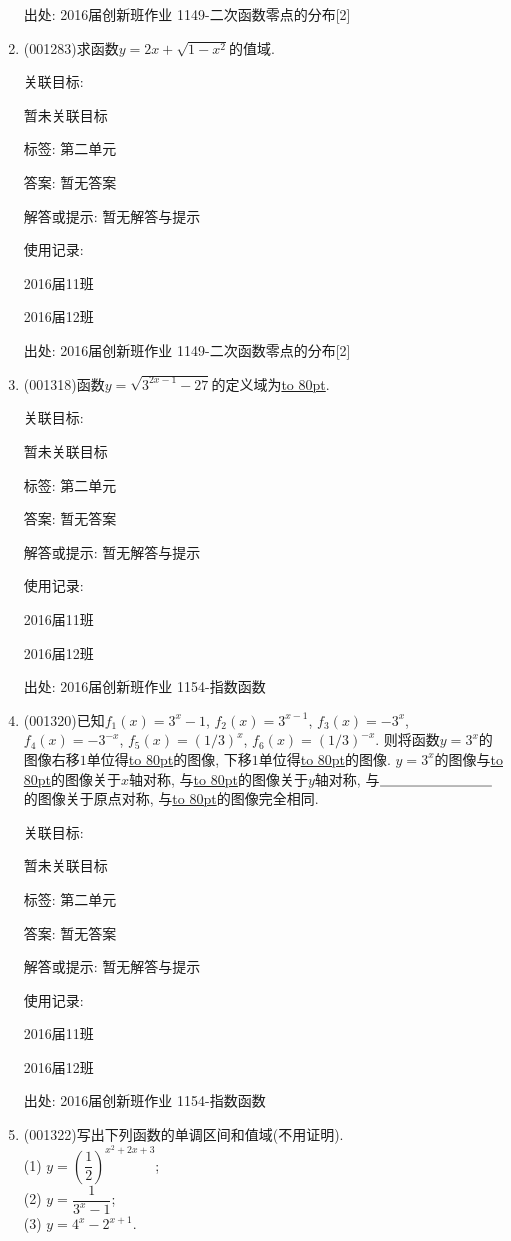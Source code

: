 \documentclass[10pt,a4paper]{article}
\newcommand{\blank}[1]{\underline{\hbox to #1pt{}}}
\begin{document}
\begin{enumerate}[1.]
出处: 2016届创新班作业	1149-二次函数零点的分布[2]
\item { (001283)}求函数$y=2x+\sqrt{1-x^2}$的值域.


关联目标:

暂未关联目标



标签: 第二单元

答案: 暂无答案

解答或提示: 暂无解答与提示

使用记录:

2016届11班	

2016届12班	


出处: 2016届创新班作业	1149-二次函数零点的分布[2]
\item { (001318)}函数$y=\sqrt{3^{2x-1}-27}$的定义域为\blank{80}.


关联目标:

暂未关联目标



标签: 第二单元

答案: 暂无答案

解答或提示: 暂无解答与提示

使用记录:

2016届11班	

2016届12班	


出处: 2016届创新班作业	1154-指数函数
\item { (001320)}已知$f_1(x)=3^x-1$, $f_2(x)=3^{x-1}$, $f_3(x)=-3^x$, $f_4(x)=-3^{-x}$, $f_5(x)=(1/3)^x$, $f_6(x)=(1/3)^{-x}$. 则将函数$y=3^x$的图像右移$1$单位得\blank{80}的图像, 下移$1$单位得\blank{80}的图像. $y=3^x$的图像与\blank{80}的图像关于$x$轴对称, 与\blank{80}的图像关于$y$轴对称, 与$\blank{80}$的图像关于原点对称, 与\blank{80}的图像完全相同.


关联目标:

暂未关联目标



标签: 第二单元

答案: 暂无答案

解答或提示: 暂无解答与提示

使用记录:

2016届11班	

2016届12班	


出处: 2016届创新班作业	1154-指数函数
\item { (001322)}写出下列函数的单调区间和值域(不用证明).\\ 
(1) $y=\left(\dfrac{1}{2}\right)^{x^2+2x+3}$;\\ 
(2) $y=\dfrac{1}{3^x-1}$;\\ 
(3) $y=4^x-2^{x+1}$.



\end{enumerate}
\end{document}
